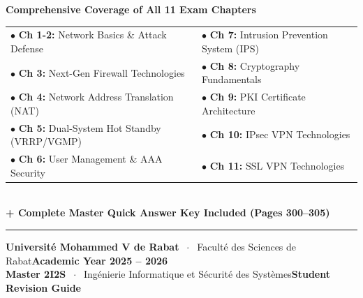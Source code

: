 \documentclass[10pt,a4paper]{article}
\begin{document}
\begin{titlepage}
    \begin{tcolorbox}[
        colback=qbg,
        colframe=hblue!25,
        arc=2.5mm,
        boxrule=0.8pt,
        width=0.90\textwidth,
        halign=left,
        top=11pt,
        bottom=11pt,
        left=16pt,
        right=16pt
    ]
        \centering
        {\bfseries\color{hblue}\normalsize Comprehensive Coverage of All 11 Exam Chapters}\\[0.6em]
        \renewcommand{\arraystretch}{1.25}
        \begin{tabular}{p{7.1cm}p{7.1cm}}
            {\small $\bullet$ \textbf{Ch 1-2:} Network Basics \& Attack Defense} & 
            {\small $\bullet$ \textbf{Ch 7:} Intrusion Prevention System (IPS)} \\
            {\small $\bullet$ \textbf{Ch 3:} Next-Gen Firewall Technologies} & 
            {\small $\bullet$ \textbf{Ch 8:} Cryptography Fundamentals} \\
            {\small $\bullet$ \textbf{Ch 4:} Network Address Translation (NAT)} & 
            {\small $\bullet$ \textbf{Ch 9:} PKI Certificate Architecture} \\
            {\small $\bullet$ \textbf{Ch 5:} Dual-System Hot Standby (VRRP/VGMP)} & 
            {\small $\bullet$ \textbf{Ch 10:} IPsec VPN Technologies} \\
            {\small $\bullet$ \textbf{Ch 6:} User Management \& AAA Security} & 
            {\small $\bullet$ \textbf{Ch 11:} SSL VPN Technologies} \\
        \end{tabular}\\[0.7em]
        {\footnotesize\color{ansgreen}\textbf{+ Complete Master Quick Answer Key Included (Pages 300--305)}}
    \end{tcolorbox}
    
    \vfill
    
    {\color{hblue!40}\rule{0.90\textwidth}{0.8pt}}\par
    \vspace{0.45em}
    {\footnotesize\color{darkslate!75}
    \textbf{Université Mohammed V de Rabat} $\;\cdot\;$ Faculté des Sciences de Rabat\hfill \textbf{Academic Year 2025 -- 2026}\\[0.2em]
    \textbf{Master 2I2S} $\;\cdot\;$ Ingénierie Informatique et Sécurité des Systèmes\hfill \textbf{Student Revision Guide}
    }\par
    \vspace*{0.2cm}
\end{titlepage}
\end{document}
